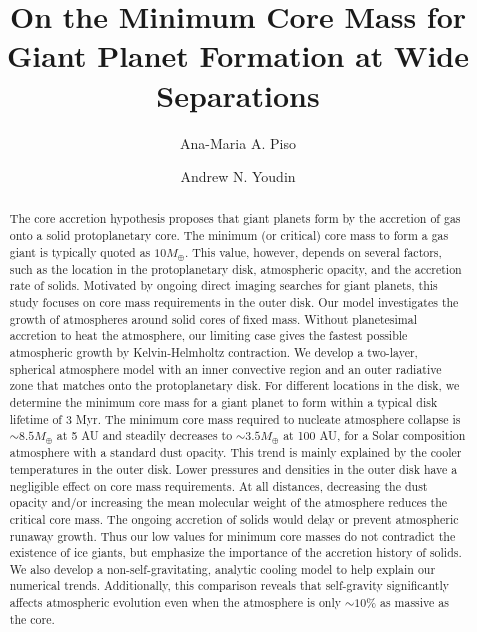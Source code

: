 \documentclass[apj, numberedappendix]{emulateapj}
\begin{document}



\title{On the Minimum Core Mass for Giant Planet Formation at Wide Separations}

\author{Ana-Maria A. Piso}

\author{Andrew N. Youdin}


\begin{abstract}

The core accretion hypothesis proposes that giant planets form by the accretion of gas onto a solid protoplanetary core. The minimum (or critical) core mass to form a gas giant is typically quoted as $10 M_{\oplus}$. This value, however, depends on several factors, such as the location in the protoplanetary disk, atmospheric opacity, and the accretion rate of solids.  Motivated by ongoing direct imaging searches for giant planets, this study focuses on core mass requirements in the outer disk.
Our model investigates the growth of atmospheres around solid cores of fixed mass.  Without planetesimal accretion to heat the atmosphere, our limiting case gives the fastest possible atmospheric growth by Kelvin-Helmholtz contraction. We develop a two-layer, spherical atmosphere model with an inner convective region and an outer radiative zone that matches onto the protoplanetary disk.  For different locations in the disk, we determine the minimum core mass for a giant planet to form within a typical disk lifetime of 3 Myr.   The minimum core mass required to nucleate atmosphere collapse is $\sim$$8.5 M_{\oplus}$ at 5 AU and steadily decreases to $\sim$$3.5 M_{\oplus}$ at 100 AU, for a Solar composition atmosphere with a standard dust opacity.   This trend is mainly explained by the cooler temperatures in the outer disk. Lower pressures and densities in the outer disk have a negligible effect on core mass requirements.  At all distances, decreasing the dust opacity and/or increasing the mean molecular weight of the atmosphere reduces the critical core mass.   The ongoing accretion of solids would delay or prevent atmospheric runaway growth.  Thus our low values for minimum core masses do not contradict the existence of ice giants, but emphasize the importance of the accretion history of solids.  We also develop a non-self-gravitating, analytic cooling model to help explain our numerical trends.  Additionally, this comparison reveals that self-gravity significantly affects atmospheric evolution even when the atmosphere is only $\sim$$10\%$ as massive as the core.
\end{abstract}
\end{document}
